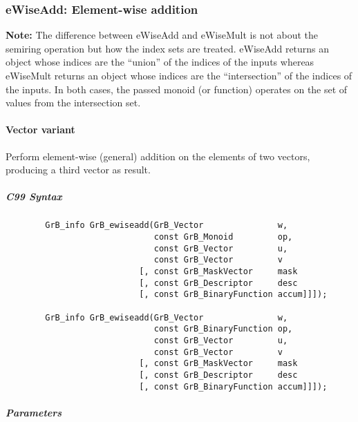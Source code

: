\subsubsection{{\sf eWiseAdd}: Element-wise addition}

{\bf Note:} The difference between {\sf eWiseAdd} and {\sf eWiseMult} is not about the semiring operation but how the index sets are treated.
 {\sf eWiseAdd} returns an object whose indices are the ``union'' of the indices of the inputs whereas  
 {\sf eWiseMult} returns an object whose indices are the ``intersection'' of the indices of the inputs. In both cases, the passed monoid (or function) operates on the 
 set of values from the intersection set. 

\paragraph{Vector variant}

Perform element-wise (general) addition on the elements of two vectors,
producing a third vector as result.

\subparagraph{C99 Syntax}

\begin{verbatim}
        GrB_info GrB_ewiseadd(GrB_Vector               w,
                              const GrB_Monoid         op, 
                              const GrB_Vector         u,
                              const GrB_Vector         v
                           [, const GrB_MaskVector     mask
                           [, const GrB_Descriptor     desc
                           [, const GrB_BinaryFunction accum]]]);
                            
        GrB_info GrB_ewiseadd(GrB_Vector               w,
                              const GrB_BinaryFunction op, 
                              const GrB_Vector         u,
                              const GrB_Vector         v
                           [, const GrB_MaskVector     mask
                           [, const GrB_Descriptor     desc
                           [, const GrB_BinaryFunction accum]]]);
\end{verbatim}

\subparagraph{Parameters}

